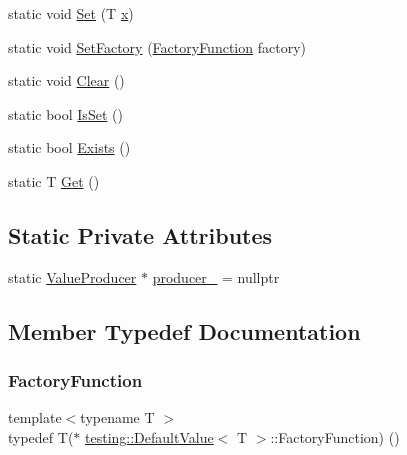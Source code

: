 \begin{DoxyCompactItemize}
\item 
static void \mbox{\hyperlink{classtesting_1_1_default_value_a5698814be364b9ac26e72ad37d6ff14e}{Set}} (T \mbox{\hyperlink{_obj__test_2lib_2googletest-master_2googlemock_2test_2gmock-matchers__test_8cc_a6150e0515f7202e2fb518f7206ed97dc}{x}})
\item 
static void \mbox{\hyperlink{classtesting_1_1_default_value_af012445ff5b194940c1427529707cb91}{Set\+Factory}} (\mbox{\hyperlink{classtesting_1_1_default_value_a5763a68d75e0a4c97fcaff708e2df803}{Factory\+Function}} factory)
\item 
static void \mbox{\hyperlink{classtesting_1_1_default_value_a8163037b60311177cb211f070c512ee3}{Clear}} ()
\item 
static bool \mbox{\hyperlink{classtesting_1_1_default_value_ad49febe2c944cbbd06451ba7d0366ca1}{Is\+Set}} ()
\item 
static bool \mbox{\hyperlink{classtesting_1_1_default_value_aec1ff9b510af7dbb86c837fd2409fd70}{Exists}} ()
\item 
static T \mbox{\hyperlink{classtesting_1_1_default_value_a4dc6dfee4cbc9cdb36f5c9cde5cf2b83}{Get}} ()
\end{DoxyCompactItemize}
\subsection*{Static Private Attributes}
\begin{DoxyCompactItemize}
\item 
static \mbox{\hyperlink{classtesting_1_1_default_value_1_1_value_producer}{Value\+Producer}} $\ast$ \mbox{\hyperlink{classtesting_1_1_default_value_a69d60d7538ccf71d9f47164320a3bf28}{producer\+\_\+}} = nullptr
\end{DoxyCompactItemize}


\subsection{Member Typedef Documentation}
\mbox{\label{classtesting_1_1_default_value_a5763a68d75e0a4c97fcaff708e2df803}} 
\subsubsection{\texorpdfstring{FactoryFunction}{FactoryFunction}\hspace{0.1cm}{\footnotesize\ttfamily [1/3]}}
{\footnotesize\ttfamily template$<$typename T $>$ \\
typedef T($\ast$ \mbox{\hyperlink{classtesting_1_1_default_value}{testing\+::\+Default\+Value}}$<$ T $>$\+::Factory\+Function) ()}

